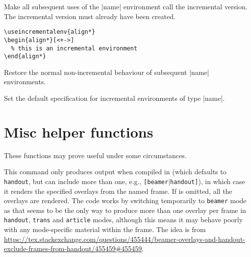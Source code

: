 \documentclass[a4paper]{ltxdoc}
\begin{document}
\begin{command}{{\useincrementalenv}}
  Make all subsequent uses of the |name| environment call the incremental
  version.  The incremental version must already have been created.
  \example
\begin{verbatim}
\useincrementalenv{align*}
\begin{align*}[<+->]
  % this is an incremental environment
\end{align*}
\end{verbatim}
\end{command}

\begin{command}{{\usenonincrementalenv}}
  Restore the normal non-incremental behaviour of  subsequent |name| environments.
\end{command}


\begin{command}{{\setincrementalenvspec}}
  Set the default specification for incremental environments of type |name|.
\end{command}






\section{Misc helper functions}\label{sec:helper}

These functions may prove useful under some circumstances.

\begin{command}{\handoutframe{}}
  This command only produces output when compiled in  (which
  defaults to \texttt{handout}, but can include more than one, e.g.,
  \texttt{[beamer$\mid$handout]}), in which case it renders the specified
  overlays from the named frame.  If  is omitted,
  all the overlays are rendered.  The code works by switching temporarily to
  \texttt{beamer} mode as that seems to be the only way to produce more than one
  overlay per frame in \texttt{handout}, \texttt{trans} and \texttt{article}
  modes, although this means it may behave poorly with any mode-specific
  material within the frame.  The idea is from
  \url{https://tex.stackexchange.com/questions/455444/beamer-overlays-and-handout-exclude-frames-from-handout/455459#455459}.
\end{command}
\end{document}
